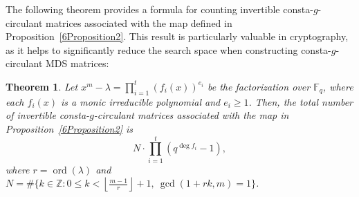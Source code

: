 \documentclass[12pt]{article}
\newtheorem{theorem}{Theorem}
\begin{document}
The following theorem provides a formula for counting invertible consta-\( g \)-circulant matrices associated with the map defined in Proposition~\ref{6Proposition2}. This result is particularly valuable in cryptography, as it helps to significantly reduce the search space when constructing consta-$g$-circulant MDS matrices:

\begin{theorem}
	Let \( x^m - \lambda = \prod_{i=1}^{t} (f_i(x))^{e_i} \) be the factorization over \( \mathbb{F}_q \), where each \( f_i(x) \) is a monic irreducible polynomial and \( e_i \ge 1 \). Then, the total number of invertible consta-\( g \)-circulant matrices associated with the map in Proposition~\ref{6Proposition2} is
	\[
	N\cdot \prod_{i=1}^{t} \left( q^{\deg f_i} - 1 \right),
	\]
	where \( r = \operatorname{ord}(\lambda) \) and $N=\#\{k\in \mathbb{Z}: 0\leq k< \left\lfloor \frac{m - 1}{r} \right\rfloor +1,~\gcd(1+rk,m)=1\}$.
\end{theorem}
\end{document}
